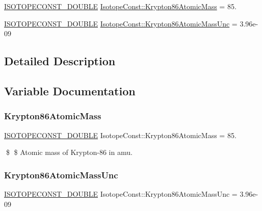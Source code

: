 \begin{DoxyCompactItemize}
\item 
\mbox{\hyperlink{group___isotope_const-_macros_ga8f45a7272ce02c0b4c65c44636ed719a}{I\+S\+O\+T\+O\+P\+E\+C\+O\+N\+S\+T\+\_\+\+D\+O\+U\+B\+LE}} \mbox{\hyperlink{group___isotope_const-_krypton-_kr86_ga36a1ff47d5d883cf3f2adb06882768c6}{Isotope\+Const\+::\+Krypton86\+Atomic\+Mass}} = 85.
\item 
\mbox{\hyperlink{group___isotope_const-_macros_ga8f45a7272ce02c0b4c65c44636ed719a}{I\+S\+O\+T\+O\+P\+E\+C\+O\+N\+S\+T\+\_\+\+D\+O\+U\+B\+LE}} \mbox{\hyperlink{group___isotope_const-_krypton-_kr86_ga13abd40db3a9d572a79aa6e6b83f7a54}{Isotope\+Const\+::\+Krypton86\+Atomic\+Mass\+Unc}} = 3.\+96e-\/09
\end{DoxyCompactItemize}


\subsection{Detailed Description}


\subsection{Variable Documentation}
\mbox{\label{group___isotope_const-_krypton-_kr86_ga36a1ff47d5d883cf3f2adb06882768c6}} 
\subsubsection{\texorpdfstring{Krypton86\+Atomic\+Mass}{Krypton86AtomicMass}}
{\footnotesize\ttfamily \mbox{\hyperlink{group___isotope_const-_macros_ga8f45a7272ce02c0b4c65c44636ed719a}{I\+S\+O\+T\+O\+P\+E\+C\+O\+N\+S\+T\+\_\+\+D\+O\+U\+B\+LE}} Isotope\+Const\+::\+Krypton86\+Atomic\+Mass = 85.}

\$ \$ Atomic mass of Krypton-\/86 in amu. \mbox{\label{group___isotope_const-_krypton-_kr86_ga13abd40db3a9d572a79aa6e6b83f7a54}} 
\subsubsection{\texorpdfstring{Krypton86\+Atomic\+Mass\+Unc}{Krypton86AtomicMassUnc}}
{\footnotesize\ttfamily \mbox{\hyperlink{group___isotope_const-_macros_ga8f45a7272ce02c0b4c65c44636ed719a}{I\+S\+O\+T\+O\+P\+E\+C\+O\+N\+S\+T\+\_\+\+D\+O\+U\+B\+LE}} Isotope\+Const\+::\+Krypton86\+Atomic\+Mass\+Unc = 3.\+96e-\/09}

